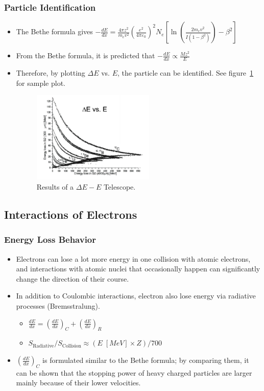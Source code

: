 \subsubsection{Particle Identification}
\begin{itemize}
    \item The Bethe formula gives $-\frac{dE}{dx}=\frac{4\pi z^2}{m_ev^2}\left(\frac{e^2}{4\pi\varepsilon_0}\right)^2N_e\left[\ln\left(\frac{2m_ev^2}{I(1-\beta^2)}\right)-\beta^2\right]$
    \item From the Bethe formula, it is predicted that $-\frac{dE}{dx}\propto \frac{Mz^2}{E}$
    \item Therefore, by plotting $\Delta E$ vs. $E$, the particle can be identified. See figure~\ref{fig:DeltaE_E_telescope} for sample plot.
    \begin{figure}
        \centering
        \includegraphics[width=0.55\textwidth]{images/DeltaE_E_telescope.png}
        \caption{Results of a $\Delta E-E$ Telescope.}
        \label{fig:DeltaE_E_telescope}
    \end{figure}
\end{itemize}

\subsection{Interactions of Electrons}
\subsubsection{Energy Loss Behavior}
\begin{itemize}
    \item Electrons can lose a lot more energy in one collision with atomic electrons, and interactions with atomic nuclei that occasionally happen can significantly change the direction of their course. 
    \item In addition to Coulombic interactions, electron also lose energy via radiative processes (Bremsstralung).
    \begin{itemize}
        \item[] $\frac{dE}{dx}=\left(\frac{dE}{dx}\right)_C+\left(\frac{dE}{dx}\right)_R$
        \item[] $S_\text{Radiative}/S_\text{Collision}\approx 
    (E\;[MeV]\times Z)/700$
    \end{itemize}
    \item $\left(\frac{dE}{dx}\right)_C$ is formulated similar to the Bethe formula; by comparing them, it can be shown that the stopping power of heavy charged particles are larger mainly because of their lower velocities. 
\end{itemize}
